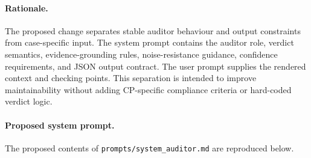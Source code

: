 \paragraph{Rationale.}
The proposed change separates stable auditor behaviour and output constraints from
case-specific input. The system prompt contains the auditor role, verdict semantics,
evidence-grounding rules, noise-resistance guidance, confidence requirements, and
JSON output contract. The user prompt supplies the rendered context and checking
points. This separation is intended to improve maintainability without adding
CP-specific compliance criteria or hard-coded verdict logic.

\paragraph{Proposed system prompt.}
The proposed contents of \texttt{prompts/system\_auditor.md} are reproduced below.

